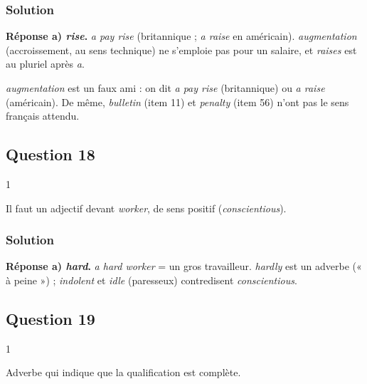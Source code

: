 \documentclass[11pt,a4paper]{article}
\begin{document}
\hypertarget{solution-16}{%
\subsubsection{Solution}\label{solution-16}}

\textbf{Réponse a) \emph{rise}.} \emph{a pay rise} (britannique ; \emph{a raise} en américain). \emph{augmentation} (accroissement, au sens technique) ne s'emploie pas pour un salaire, et \emph{raises} est au pluriel après \emph{a}.

\begin{piege}

\emph{augmentation} est un faux ami : on dit \emph{a pay rise} (britannique) ou \emph{a raise} (américain). De même, \emph{bulletin} (item 11) et \emph{penalty} (item 56) n'ont pas le sens français attendu.

\end{piege}

\hypertarget{question-18}{%
\subsection{Question 18}\label{question-18}}

\begin{indication}{1}

Il faut un adjectif devant \emph{worker}, de sens positif (\emph{conscientious}).

\end{indication}

\hypertarget{solution-17}{%
\subsubsection{Solution}\label{solution-17}}

\textbf{Réponse a) \emph{hard}.} \emph{a hard worker} = un gros travailleur. \emph{hardly} est un adverbe (« à peine ») ; \emph{indolent} et \emph{idle} (paresseux) contredisent \emph{conscientious}.

\hypertarget{question-19}{%
\subsection{Question 19}\label{question-19}}

\begin{indication}{1}

Adverbe qui indique que la qualification est complète.

\end{indication}
\end{document}
